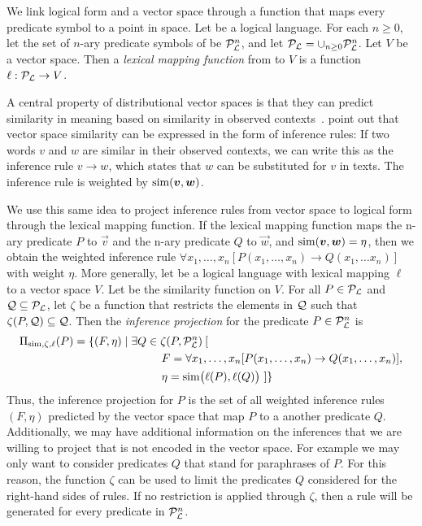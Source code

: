 We link logical form and a vector space through a function that maps every
predicate symbol to a point in space. Let \loglang be a logical language. For
each $n \ge 0$, let the set of $n$-ary predicate symbols of \loglang be
${\cal{P}}_{{\cal{L}}}^n$, and let ${\cal{P}}_{{\cal{L}}} = \cup_{n \ge 0}
{\cal{P}}_{{\cal{L}}}^n$. Let $V$ be a vector space. Then a \emph{lexical mapping
function} from \loglang to $V$ is a function $\ell:
{\cal{P}}_{{\cal{L}}} \to V$.

A central property of distributional vector spaces is that they can predict
similarity in meaning based on similarity in observed
contexts~\citep{harris:wj1954}. \citet{lin:nlej2001} point out that vector space
similarity can be expressed in the form of inference rules: If two words $v$ and
$w$ are similar in their observed contexts, we can write this as the inference
rule $v \to w$, which states that $w$ can be substituted for $v$ in texts. The
inference rule is weighted by $\simfunc(\vec v, \vec w)$.

We use this same idea to project inference rules from vector space to logical
form through the lexical mapping function. If the lexical mapping function maps
the n-ary predicate $P$ to $\vec v$ and the n-ary predicate $Q$ to $ \vec w$,
and $\simfunc(\vec v, \vec w) = \eta$, then we obtain the weighted inference
rule $\forall x_1, \ldots, x_n[ P(x_1, \ldots, x_n) \to Q(x_1, \ldots x_n) ]$
with weight $\eta$. More generally, let \loglang be a logical language with
lexical mapping $\ell$ to a vector space $V$. Let \simfunc{} be the similarity
function on $V$. For all $P \in {\cal{P}}_{{\cal{L}}}$ and ${\cal Q} \subseteq
{\cal{P}}_{{\cal{L}}}$, let $\zeta$ be a function that restricts the elements in 
${\cal Q}$ such that $\zeta(P, {\cal Q}) \subseteq {\cal Q}$. Then the
\emph{inference projection} for the predicate $P \in {\cal{P}}_{{\cal{L}}}^n$ is
\begin{align*}
&\Pi_{\simfunc, \zeta, \ell}(P) = \{ (F, \eta) \mid \exists Q \in \zeta(P, \predsym{\loglang}^n)\:[ \\ 
& \hspace{125px} F = \forall x_1, \ldots, x_n[P(x_1, \ldots, x_n) \to Q(x_1, \ldots, x_n)], \\
& \hspace{125px} \eta = \simfunc\big(\ell(P), \ell(Q)\big) ~] \}
\end{align*}
Thus, the inference projection for $P$ is the set of all weighted inference
rules $(F, \eta)$ predicted by the vector space that map $P$ to a another
predicate $Q$. Additionally, we may have additional information on the 
inferences that we are willing to project that is not encoded in the vector 
space. For example we may only want to consider
predicates $Q$ that stand for paraphrases of $P$. For this reason, the
function $\zeta$ can be used to limit the predicates $Q$ considered for the right-hand
sides of rules.  If no restriction is applied through $\zeta$, then a rule will
be generated for every predicate in ${\cal{P}}_{{\cal{L}}}^n$. 


